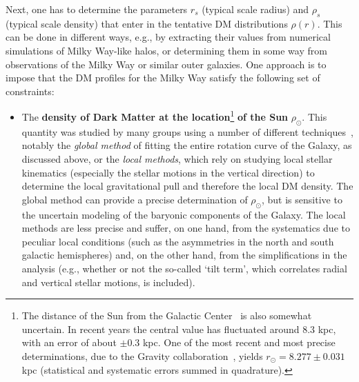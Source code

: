 Next, one has to determine the parameters $r_s$ (typical scale radius) and $\rho_s$ (typical scale density) that enter in 
the tentative DM distributions $\rho(r)$. This can be done in different ways, e.g., by extracting their values from numerical simulations of Milky Way-like halos, or determining them in some way from observations of the Milky Way or similar outer galaxies.  
One approach 
is to impose that the DM profiles for the Milky Way satisfy the following set of constraints:
\begin{itemize}
\item[A)] The {\bf density of Dark Matter at the location}\footnote{The distance of the Sun from the Galactic Center~\cite{rSun} is also somewhat uncertain. In recent years the central value has fluctuated around 8.3 kpc, with an error of about $\pm 0.3$ kpc. One of the most recent and most precise determinations, due to the {\sc Gravity} collaboration~\cite{rSun}, yields $r_\odot= 8.277 \pm 0.031$  kpc (statistical and systematic errors summed in quadrature).} {\bf of the Sun} $\rho_\odot$.
This quantity was studied by many groups using a number of different techniques~\cite{rhoSun}, notably the {\it global method} of fitting the entire rotation curve of the Galaxy, as discussed above, or the {\it local methods}, which rely on studying local stellar kinematics (especially the stellar motions in the vertical direction) to determine the local gravitational pull and therefore the local DM density. 
The global method can provide a precise determination of $\rho_\odot$, but is sensitive to the uncertain modeling of the baryonic components of the Galaxy.
The local methods are less precise and suffer, on one hand, from the systematics due to peculiar local conditions (such as the asymmetries in the north and south galactic hemispheres) and, on the other hand, from the simplifications in the analysis (e.g., whether or not the so-called `tilt term', which correlates radial and vertical stellar motions, is included).


\end{itemize}
